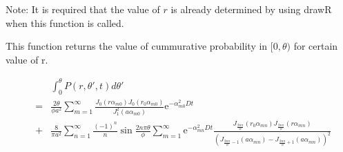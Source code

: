\documentclass{article}
\begin{document}
Note: It is required that the value of $r$ is already determined by using drawR when this function is called.

This function returns the value of cummurative probability in $[0,\theta)$ for certain value of r.

\begin{eqnarray}
    & & \int^\theta_0 P(r, \theta', t) d\theta' \nonumber\\
    &=& \frac{2\theta}{\phi a^2} \sum^{\infty}_{m=1}
        \frac{J_0(r\alpha_{m0}) J_0(r_0\alpha_{m0})}
             {J^2_1(a\alpha_{m0})}
        \mathrm{e}^{-\alpha^2_{m0}Dt} \nonumber \\
    &+& \frac{8}{\pi a^2}\sum^{\infty}_{n=1}
        \frac{(-1)^n}{n}\sin\frac{2n\pi\theta}{\phi}
        \sum^{\infty}_{m=1}
        \mathrm{e}^{-\alpha_{mn}^2Dt}
        \frac{J_{\frac{2n\pi}{\phi}}(r_0\alpha_{mn})
              J_{\frac{2n\pi}{\phi}}(r\alpha_{mn})}
             {(J_{\frac{2n\pi}{\phi} - 1}(a\alpha_{mn})
             - J_{\frac{2n\pi}{\phi} + 1}(a\alpha_{mn}))^2}
        \nonumber
\end{eqnarray}
\end{document}
